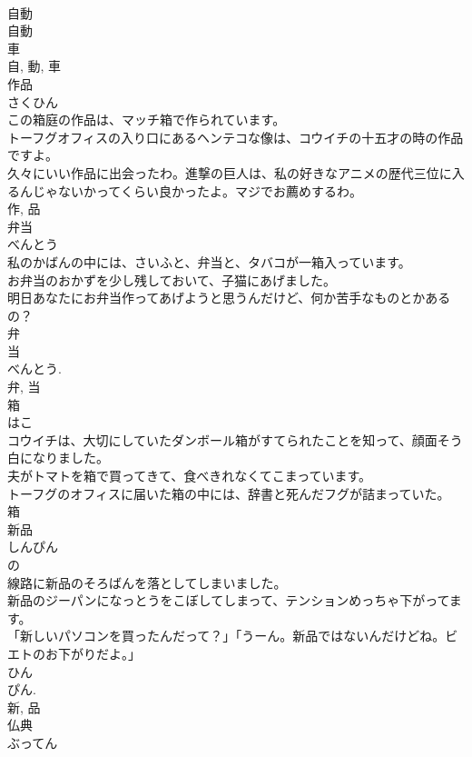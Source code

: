 \documentclass[8pt]{extreport}
\begin{document}
\begin{CJK}{UTF8}{min}
\\	自動 
\\	自動 
\\	車
\\	自, 動, 車	
\\	作品	
\\	さくひん	
\\	この箱庭の作品は、マッチ箱で作られています。	
\\	トーフグオフィスの入り口にあるヘンテコな像は、コウイチの十五才の時の作品ですよ。	
\\	久々にいい作品に出会ったわ。進撃の巨人は、私の好きなアニメの歴代三位に入るんじゃないかってくらい良かったよ。マジでお薦めするわ。	
\\	作, 品	
\\	弁当	
\\	べんとう	
\\	私のかばんの中には、さいふと、弁当と、タバコが一箱入っています。	
\\	お弁当のおかずを少し残しておいて、子猫にあげました。	
\\	明日あなたにお弁当作ってあげようと思うんだけど、何か苦手なものとかあるの？	
\\	弁 
\\	当 
\\	べんとう. 
\\	弁, 当	
\\	箱	
\\	はこ	
\\	コウイチは、大切にしていたダンボール箱がすてられたことを知って、顔面そう白になりました。	
\\	夫がトマトを箱で買ってきて、食べきれなくてこまっています。	
\\	トーフグのオフィスに届いた箱の中には、辞書と死んだフグが詰まっていた。	
\\	箱	
\\	新品	
\\	しんぴん	
\\	の 
\\	線路に新品のそろばんを落としてしまいました。	
\\	新品のジーパンになっとうをこぼしてしまって、テンションめっちゃ下がってます。	
\\	「新しいパソコンを買ったんだって？」「うーん。新品ではないんだけどね。ビエトのお下がりだよ。」	
\\	ひん 
\\	ぴん. 
\\	新, 品	
\\	仏典	
\\	ぶってん	

\end{CJK}
\end{document}
